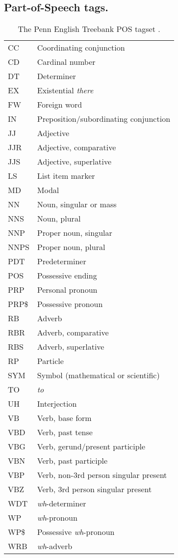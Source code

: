 \subsection{Part-of-Speech tags.}
%
\begin{table}[!h]
	\tiny
	\caption[The Penn English Treebank POS tagset]{The Penn English Treebank POS tagset \parencite{Marcus.1993}.}
	\label{tab:POS_tags}
	\centering
	\begin{tabular}{ll}
		\toprule
		CC& Coordinating conjunction \\
		CD& Cardinal number\\
		DT& Determiner\\
		EX& Existential \textit{there}\\
		FW& Foreign word\\
		IN& Preposition/subordinating conjunction\\
		JJ& Adjective\\
		JJR& Adjective, comparative\\
		JJS& Adjective, superlative\\
		LS& List item marker\\
		MD& Modal\\
		NN& Noun, singular or mass\\
		NNS& Noun, plural\\
		NNP& Proper noun, singular\\
		NNPS& Proper noun, plural\\
		PDT& Predeterminer\\
		POS& Possessive ending\\
		PRP& Personal pronoun\\
		PRP\$& Possessive pronoun\\
		RB& Adverb\\
		RBR& Adverb, comparative\\
		RBS& Adverb, superlative\\
		RP& Particle\\
		SYM& Symbol (mathematical or scientific)\\
		TO& \textit{to}\\
		UH& Interjection\\
		VB& Verb, base form\\
		VBD& Verb, past tense\\
		VBG& Verb, gerund/present participle\\
		VBN& Verb, past participle\\
		VBP& Verb, non-3rd person singular present \\
		VBZ& Verb, 3rd person singular present\\
		WDT& \textit{wh}-determiner\\
		WP& \textit{wh}-pronoun\\
		WP\$& Possessive \textit{wh}-pronoun\\
		WRB& \textit{wh}-adverb\\
		\bottomrule
	\end{tabular}
\end{table}
